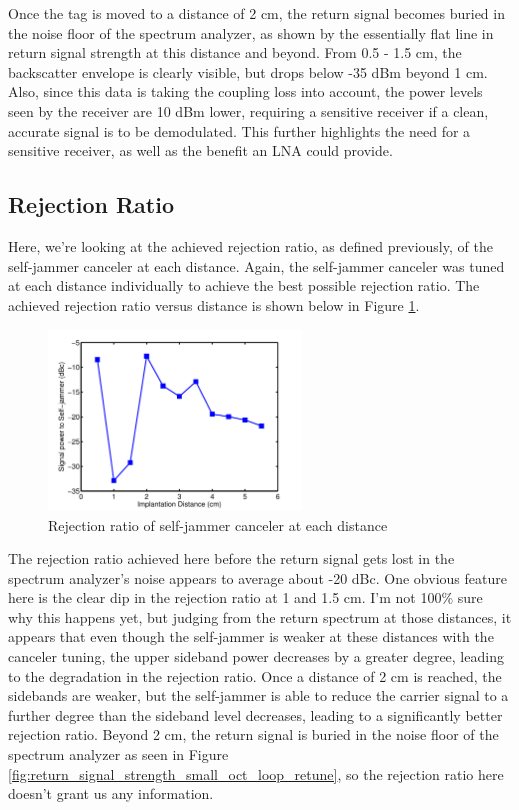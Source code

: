 \documentclass[12pt,onecolumn,titlepage]{article}
\begin{document}
Once the tag is moved to a distance of 2 cm, the return signal becomes buried in the noise floor of the spectrum analyzer, as shown by the essentially flat line in return signal strength at this distance and beyond. From 0.5 - 1.5 cm, the backscatter envelope is clearly visible, but drops below -35 dBm beyond 1 cm. Also, since this data is taking the coupling loss into account, the power levels seen by the receiver are 10 dBm lower, requiring  a sensitive receiver if a clean, accurate signal is to be demodulated. This further highlights the need for a sensitive receiver, as well as the benefit an LNA could provide.

\subsection{Rejection Ratio}
\indent \indent Here, we're looking at the achieved rejection ratio, as defined previously, of the self-jammer canceler at each distance. Again, the self-jammer canceler was tuned at each distance individually to achieve the best possible rejection ratio. The achieved rejection ratio versus distance is shown below in Figure \ref{fig:rejection_ratio_retune}.

\begin{figure}[h]
	\centering
	\includegraphics[width=0.6\textwidth]{Pictures/19Feb2013/rejection_ratio_retune}
	\caption{Rejection ratio of self-jammer canceler at each distance}
	\label{fig:rejection_ratio_retune}
\end{figure}

The rejection ratio achieved here before the return signal gets lost in the spectrum analyzer's noise appears to average about -20 dBc. One obvious feature here is the clear dip in the rejection ratio at 1 and 1.5 cm. I'm not 100\% sure why this happens yet, but judging from the return spectrum at those distances, it appears that even though the self-jammer is weaker at these distances with the canceler tuning, the upper sideband power decreases by a greater degree, leading to the degradation in the rejection ratio. Once a distance of 2 cm is reached, the sidebands are weaker, but the self-jammer is able to reduce the carrier signal to a further degree than the sideband level decreases, leading to a significantly better rejection ratio. Beyond 2 cm, the return signal is buried in the noise floor of the spectrum analyzer as seen in Figure \ref{fig:return_signal_strength_small_oct_loop_retune}, so the rejection ratio here doesn't grant us any information.
\end{document}
